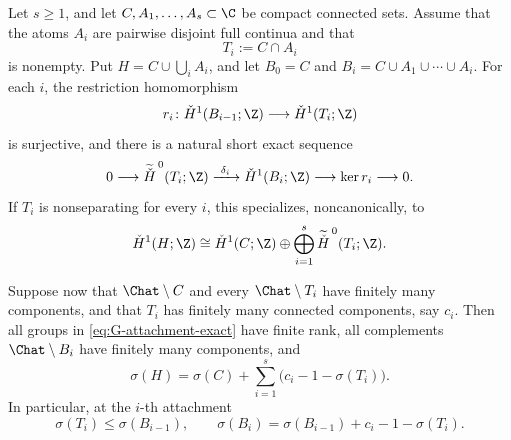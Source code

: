 \begin{theorem}
\label{thm:separation-budget}
Let $s\ge1$, and let $C,A_1,\dots,A_s\subset\C$ be compact connected sets.
Assume that the
atoms $A_i$ are pairwise disjoint full continua and that
\[
 T_i:=C\cap A_i
\]
is nonempty.  Put $H=C\cup\bigcup_iA_i$, and let
$B_0=C$ and $B_i=C\cup A_1\cup\cdots\cup A_i$.  For each $i$, the
restriction homomorphism
\[
 r_i\colon\check H^1(B_{i-1};\Z)\longrightarrow
 \check H^1(T_i;\Z)
\]
is surjective, and there is a natural short exact
sequence
\begin{equation}
 0\longrightarrow
 \widetilde{\check H}^{\,0}(T_i;\Z)
 \xrightarrow{\ \delta_i\ }
 \check H^1(B_i;\Z)
 \longrightarrow
 \ker r_i
 \longrightarrow0.
 \label{eq:G-attachment-exact}
\end{equation}
If $T_i$ is nonseparating for every $i$, this specializes, noncanonically,
to
\begin{equation}
 \check H^1(H;\Z)
 \cong
 \check H^1(C;\Z)\oplus
 \bigoplus_{i=1}^{s}
 \widetilde{\check H}^{\,0}(T_i;\Z).
 \label{eq:G-attachment-splitting}
\end{equation}

Suppose now that $\Chat\setminus C$ and every
$\Chat\setminus T_i$ have finitely many components, and that $T_i$ has
finitely many connected components, say $c_i$.  Then all groups in
\eqref{eq:G-attachment-exact} have finite rank, all complements
$\Chat\setminus B_i$ have finitely many components, and
\begin{equation}
 \boxed{\quad
 \sigma(H)=\sigma(C)+
 \sum_{i=1}^{s}\bigl(c_i-1-\sigma(T_i)\bigr).
 \quad}
 \label{eq:G-budget}
\end{equation}
In particular, at the $i$-th attachment
\begin{equation}
 \sigma(T_i)\le \sigma(B_{i-1}),
 \qquad
 \sigma(B_i)=\sigma(B_{i-1})+c_i-1-\sigma(T_i).
 \label{eq:G-step-ledger}
\end{equation}
\end{theorem}

